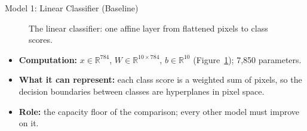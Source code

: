 \begin{frame}{Model 1: Linear Classifier (Baseline)}
\begin{figure}
\centering
{}
\caption{The linear classifier: one affine layer from flattened pixels to class scores.}
\label{fig:linear}
\end{figure}

\vspace{-0.2cm}
\begin{itemize}
    \item \textbf{Computation:} $x \in \mathbb{R}^{784}$, $W \in \mathbb{R}^{10 \times 784}$, $b \in \mathbb{R}^{10}$
          (Figure~\ref{fig:linear}); 7{,}850 parameters.
    \item \textbf{What it can represent:} each class score is a weighted sum of pixels, so the decision
          boundaries between classes are hyperplanes in pixel space.
    \item \textbf{Role:} the capacity floor of the comparison; every other model must improve on it.
\end{itemize}
\end{frame}

